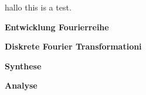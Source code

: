 \documentclass{article}
\begin{document}
 hallo this is a test.
%
\begin{figure}

\end{figure}
%
%


\large \bf Entwicklung Fourierreihe
\vspace{2cm}



{\textcolor{red} \large \bf Diskrete Fourier Transformationi}


\vspace{2cm}

\large \bf Synthese


\vspace{2cm}

\large \bf Analyse
\end{document}
